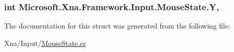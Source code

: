 \subsubsection[{Y}]{\setlength{\rightskip}{0pt plus 5cm}int Microsoft.\+Xna.\+Framework.\+Input.\+Mouse\+State.\+Y\hspace{0.3cm}{\ttfamily [get]}, {\ttfamily [set]}}\label{struct_microsoft_1_1_xna_1_1_framework_1_1_input_1_1_mouse_state_a0f3da79ce609dccc256f7a94cfcf5fb9}


The documentation for this struct was generated from the following file\+:\begin{DoxyCompactItemize}
\item 
Xna/\+Input/\hyperlink{_mouse_state_8cs}{Mouse\+State.\+cs}\end{DoxyCompactItemize}
